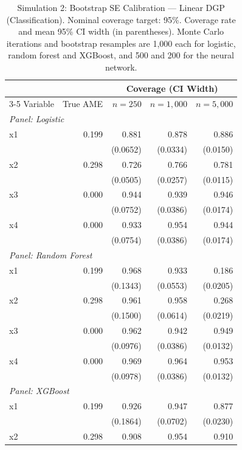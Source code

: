 \begin{table}[htbp]
\centering
\small
\begin{threeparttable}
\caption{Simulation 2: Bootstrap SE Calibration --- Linear DGP (Classification). Nominal coverage target: 95\%. Coverage rate and mean 95\% CI width (in parentheses). Monte Carlo iterations and bootstrap resamples are 1{,}000 each for logistic, random forest and XGBoost, and 500 and 200 for the neural network.}
\label{tab:sim2_calibration_linear}
\begin{tabular}{lrrrr}
\toprule
 & & \multicolumn{3}{c}{Coverage (CI Width)} \\
\cmidrule(lr){3-5}
Variable & True AME & $n=250$ & $n=1,000$ & $n=5,000$ \\
\midrule
\multicolumn{5}{l}{\textit{Panel: Logistic}} \\
\quad x1 & 0.199 & 0.881 & 0.878 & 0.886 \\
 &  & (0.0652) & (0.0334) & (0.0150) \\
\quad x2 & 0.298 & 0.726 & 0.766 & 0.781 \\
 &  & (0.0505) & (0.0257) & (0.0115) \\
\quad x3 & 0.000 & 0.944 & 0.939 & 0.946 \\
 &  & (0.0752) & (0.0386) & (0.0174) \\
\quad x4 & 0.000 & 0.933 & 0.954 & 0.944 \\
 &  & (0.0754) & (0.0386) & (0.0174) \\
\midrule
\multicolumn{5}{l}{\textit{Panel: Random Forest}} \\
\quad x1 & 0.199 & 0.968 & 0.933 & 0.186 \\
 &  & (0.1343) & (0.0553) & (0.0205) \\
\quad x2 & 0.298 & 0.961 & 0.958 & 0.268 \\
 &  & (0.1500) & (0.0614) & (0.0219) \\
\quad x3 & 0.000 & 0.962 & 0.942 & 0.949 \\
 &  & (0.0976) & (0.0386) & (0.0132) \\
\quad x4 & 0.000 & 0.969 & 0.964 & 0.953 \\
 &  & (0.0978) & (0.0386) & (0.0132) \\
\midrule
\multicolumn{5}{l}{\textit{Panel: XGBoost}} \\
\quad x1 & 0.199 & 0.926 & 0.947 & 0.877 \\
 &  & (0.1864) & (0.0702) & (0.0230) \\
\quad x2 & 0.298 & 0.908 & 0.954 & 0.910 \\

\end{tabular}
\end{threeparttable}
\end{table}
